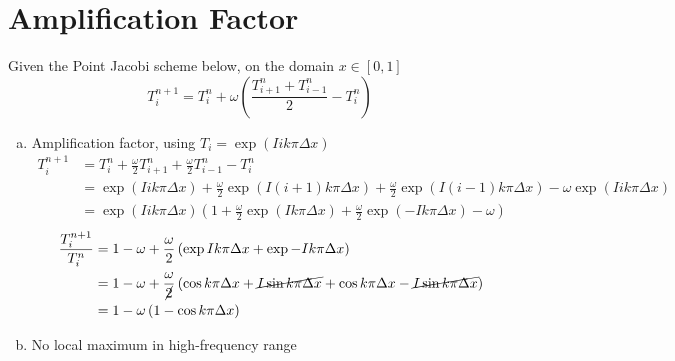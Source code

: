 \documentclass[12pt]{extarticle}
\begin{document}
\newpage
\section{Amplification Factor}

    Given the Point Jacobi scheme below, on the domain $x \in [0,1]$
    \[ T^{n+1}_i = T^n_i + \omega\left(\frac{T^n_{i+1}+T^n_{i-1}}{2}-T^n_i\right)\]
    \begin{enumerate}[(a)]
        \item Amplification factor, using $T_i = \exp(Iik\pi\Delta x)$
        \begin{equation*}
        \begin{split}
            T^{n+1}_i & = T^n_i + \frac{\omega}{2}T^n_{i+1} +\frac{\omega}{2}T^n_{i-1} - T^n_i \\
            & = \exp(Iik\pi\Delta x) + \frac{\omega}{2}\exp(I(i+1)k\pi\Delta x) + \frac{\omega}{2}\exp(I(i-1)k\pi\Delta x) - \omega\exp(Iik\pi\Delta x) \\
            & = \exp(Iik\pi\Delta x)\left(1 + \frac{\omega}{2}\exp(Ik\pi\Delta x) + \frac{\omega}{2}\exp(-Ik\pi\Delta x) -\omega\right)
        \end{split}
        \end{equation*}
        \bigskip
        \begin{equation*}
        \begin{split}
            \frac{T^{n+1}_i}{T^n_i} & = 1 - \omega + \frac{\omega}{2}\left(\exp{Ik\pi\Delta x} + \exp{-Ik\pi\Delta x}\right) \\
            & = 1 - \omega + \frac{\omega}{\cancel{2}}\left( \cos{k\pi\Delta x} + \cancel{I\sin{k\pi\Delta x}} + \cos{k\pi\Delta x} - \cancel{I\sin{k\pi\Delta x}}\right)\\
            & = 1 - \omega\left(1 - \cos{k\pi\Delta x}\right)
        \end{split}
        \end{equation*}
        
        \item No local maximum in high-frequency range
        

\end{enumerate}
\end{document}
